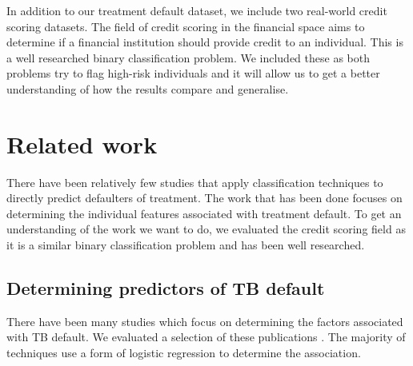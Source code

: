 \documentclass{sig-alternate-05-2015}
\begin{document}
	In addition to our treatment default dataset, we include two real-world credit scoring datasets. The field of credit scoring in the financial space aims to determine if a financial institution should provide credit to an individual. This is a well researched binary classification problem. We included these as both problems try to flag high-risk individuals and it will allow us to get a better understanding of how the results compare and generalise.
	
	\section{Related work}
	There have been relatively few studies that apply classification techniques to directly predict defaulters of treatment. The work that has been done focuses on determining the individual features associated with treatment default. To get an understanding of the work we want to do, we evaluated the credit scoring field as it is a similar binary classification problem and has been well researched. 
	\subsection{Determining predictors of TB default}
	\label{predictors_of_defaulters_related_work}
	There have been many studies which focus on determining the factors associated with TB default. We evaluated a selection of these publications \cite{chan:2003prevalence, Jha:10.1371/journal.pone.0008873, jittimanee:10.1111/j.1440-172X.2007.00650.x, Lackey:10356751520150601, muture:6660173120110101, Shargie:10.1371/journal.pmed.0040037}. The majority of techniques use a form of logistic regression to determine the association. 
	
\end{document}

